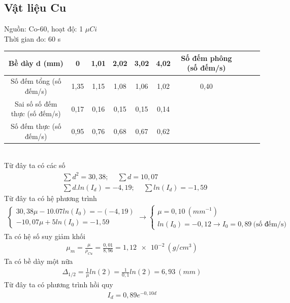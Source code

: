 \documentclass{article}
\begin{document}
\subsection{Vật liệu Cu}
Nguồn: Co-60, hoạt độ: 1 $\mu Ci$ \\
Thời gian đo: 60 s
\begin{table}[!ht]
    \centering
    \begin{adjustbox}{max width=\textwidth}
    \begin{tabular}{|c|c|c|c|c|c|c|c|c|c|}
    \hline
        Bề dày d (mm) & 0 & 1,01 & 2,02 & 3,02 & 4,02 & Số đếm phông (số đếm/s)  \\ \hline
        Số đếm tổng (số đếm/s) & 1,35 & 1,15 & 1,08 & 1,06 & 1,02 & 0,40   \\ \hline
        Sai số số đếm thực (số đếm/s) & 0,17 & 0,16 & 0,15 & 0,15 & 0,14 &  \\ \hline
        Số đếm thực (số đếm/s) & 0,95 & 0,76 & 0,68 & 0,67 & 0,62 &  \\ \hline
    \end{tabular}
    \end{adjustbox}
\end{table} \\
Từ đây ta có các số
\begin{align*}
	& \sum{d^2} = 30,38; \ \quad \sum{d} = 10,07 \\
	& \sum{d.ln(I_d)} = -4,19; \ \quad \sum{ln(I_d)} = -1,59
\end{align*}
Từ đây ta có hệ phương trình
\begin{align*}
	\begin{cases}
	30,38\mu - 10.07ln(I_0) = - (-4,19) \\ 
	-10,07\mu + 5ln(I_0) =  -1,59
	\end{cases}
	\rightarrow
	\begin{cases}
	\mu = 0,10 \ (mm^{-1}) \\
	ln(I_0) = -0,12 \rightarrow I_0 = 0,89 \ \text{(số đếm/s)}
	\end{cases}
\end{align*}
Ta có hệ số suy giảm khối
\begin{align*}
	\mu_m = \frac{\mu}{\rho_{Cu}} = \frac{0,01}{8,96} = 1,\num{12e-2} \ (g/cm^3)
\end{align*}
Ta có bề dày một nữa
\begin{align*}
	\Delta_{1/2} = \frac{1}{\mu}ln(2) = \frac{1}{0,1}ln(2) = 6,93 \ (mm)
\end{align*}
Từ đây ta có phương trình hồi quy
\begin{align*}
	I_d = 0,89e^{-0,10d}
\end{align*}
\end{document}
